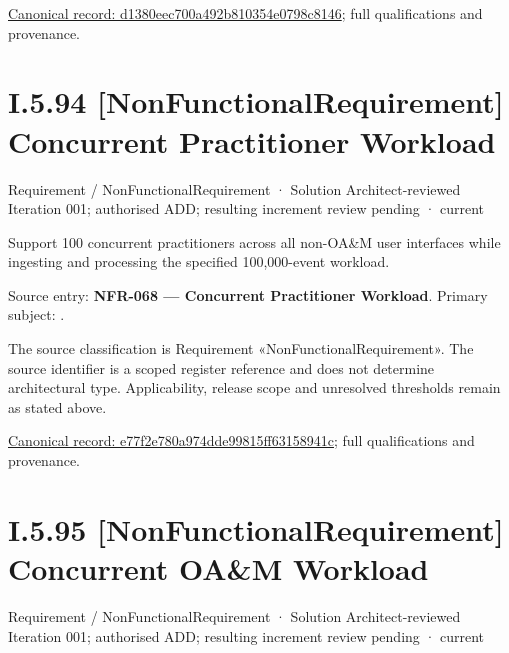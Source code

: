 {\footnotesize \href{../../../../../../../../continuum/motivation/requirement/non-functional-requirement/d1380eec700a492b810354e0798c8146.md}{Canonical record: d1380eec700a492b810354e0798c8146}; full qualifications and provenance.}\par
\section*{I.5.94 [NonFunctionalRequirement] Concurrent Practitioner Workload}
\label{navigation:I.5.94}

\label{element:e77f2e780a974dde99815ff63158941c}
{\small Requirement / NonFunctionalRequirement · Solution Architect-reviewed Iteration 001; authorised ADD; resulting increment review pending · current}\par

Support 100 concurrent practitioners across all non-OA\&M user interfaces while ingesting and processing the specified 100,000-event workload.



Source entry: \textbf{NFR-068 — Concurrent Practitioner Workload}. Primary subject: \texttt{}.



The source classification is Requirement «NonFunctionalRequirement». The source identifier is a scoped register reference and does not determine architectural type. Applicability, release scope and unresolved thresholds remain as stated above.


{\footnotesize \href{../../../../../../../../continuum/motivation/requirement/non-functional-requirement/e77f2e780a974dde99815ff63158941c.md}{Canonical record: e77f2e780a974dde99815ff63158941c}; full qualifications and provenance.}\par
\section*{I.5.95 [NonFunctionalRequirement] Concurrent OA\&M Workload}
\label{navigation:I.5.95}

\label{element:5220295ae5d144468066ae70683e0f19}
{\small Requirement / NonFunctionalRequirement · Solution Architect-reviewed Iteration 001; authorised ADD; resulting increment review pending · current}\par

